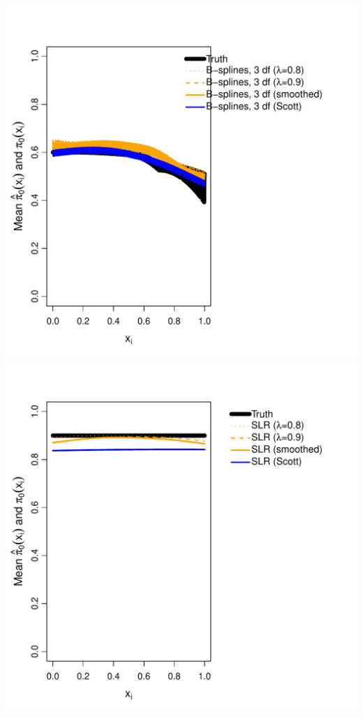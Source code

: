 \documentclass{article}\usepackage[]{graphicx}\usepackage[]{color}
\makeatletter
\def\maxwidth{ %
  \ifdim\Gin@nat@width>\linewidth
    \linewidth
  \else
    \Gin@nat@width
  \fi
}
\newenvironment{knitrout}{}{} %
\makeatother
\begin{document}
\begin{knitrout}
{\includegraphics[width=\maxwidth]{Figures/unnamed-chunk-1-7} 
\includegraphics[width=\maxwidth]{Figures/unnamed-chunk-1-8} 
}
\end{knitrout}
\end{document}
